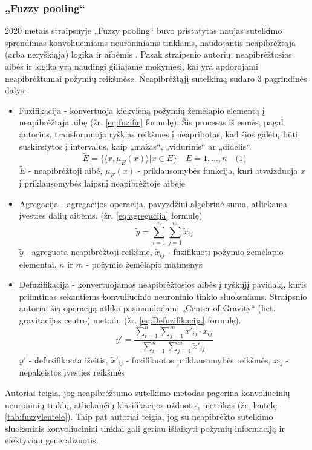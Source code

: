 \documentclass[fleqn]{VUMIFKompMagistrinis}
\begin{document}
\subsubsection{„Fuzzy pooling“}\label{skyrius:fuzzy}
2020 metais straipsnyje „Fuzzy pooling“ buvo pristatytas naujas sutelkimo sprendimas konvoliuciniams neuroniniams tinklams, naudojantis neapibrėžtąja (arba neryškiąja) logika ir aibėmis \cite{diamantis2020fuzzy}. 
Pasak straipsnio autorių, neapibrėžtosios aibės ir logika yra naudingi giliajame mokymesi, kai yra apdorojami neapibrėžtumai požymių reikšmėse. Neapibrėžtąjį sutelkimą sudaro 3 pagrindinės dalys: 
\begin{itemize}
  \item Fuzifikacija - konvertuoja kiekvieną požymių žemėlapio elementą į neapibrėžtąja aibę (žr. \ref{eq:fuzific} formulę). Šis procesas iš esmės, pagal autorius, transformuoja ryškias reikšmes į neapribotas, kad šios galėtų būti suskirstytos į intervalus, kaip „mažas“, „vidurinis“ ar „didelis“.\begin{equation}\label{eq:fuzific}
\tilde{E} = \{ \langle x, \mu_E(x) \rangle | x \in E \} \quad E = 1, \dots, n \quad \text{(1)}
\end{equation}
\(\tilde{E}\) - neapibrėžtoji aibė, \(\mu_E(x)\) - priklausomybės funkcija, kuri atvaizduoja \(x\) į priklausomybės laipsnį neapibrėžtoje aibėje
  \item Agregacija - agregacijos operacija, pavyzdžiui algebrinė suma, atliekama įvesties dalių aibėms. (žr. \ref{eq:agregacija} formulę)
  \begin{equation}\label{eq:agregacija}
\tilde{y} = \sum_{i=1}^{n} \sum_{j=1}^{m} \tilde{x}_{ij}
\end{equation}
\(\tilde{y}\) - agreguota neapibrėžtoji reikšmė, \(\tilde{x}_{ij}\) - fuzifikuoti požymio žemėlapio elementai, \(n\) ir \(m\) - požymio žemėlapio matmenys
  \item Defuzifikacija - konvertuojamos neapibrėžtosios aibės į ryškųjį pavidalą, kuris priimtinas sekantiems konvuliucinio neuroninio tinklo sluoksniams. Straipsnio autoriai šią operaciją atliko pasinaudodami „Center of Gravity“ (liet. gravitacijos centro) metodu (žr. \ref{eq:Defuzifikacija} formulę).
    \begin{equation}\label{eq:Defuzifikacija}
y' = \frac{\sum_{i=1}^{n} \sum_{j=1}^{m} \tilde{x}'_{ij} \cdot x_{ij}}{\sum_{i=1}^{n} \sum_{j=1}^{m} \tilde{x}'_{ij}}
\end{equation}
\(y′\) - defuzifikuota išeitis, \(\tilde{x}'_{ij}\) - fuzifikuotos priklausomybės reikšmės,  \(x_{ij}\) - nepakeistos įvesties reikšmės
\end{itemize}
\par
Autoriai teigia, jog neapibrėžtumo sutelkimo metodas pagerina konvoliucinių neuroninių tinklų, atliekančių klasifikacijos užduotis, metrikas (žr. lentelę \ref{tab:fuzzylentele}). Taip pat autoriai teigia, jog su neapibrėžto sutelkimo sluoksniais konvoliuciniai tinklai gali geriau išlaikyti požymių informaciją ir efektyviau generalizuotis. 
\end{document}
